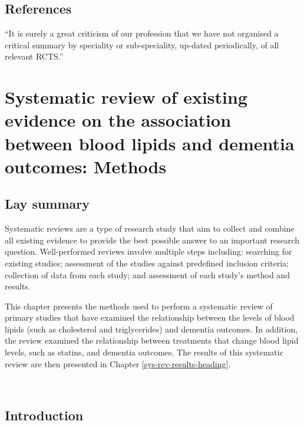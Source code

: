 \documentclass[a4paper, twoside]{templates/ociamthesis}
\begin{document}
\newpage

\hypertarget{references}{%
\section{References}\label{references}}

\begin{savequote}
``It is surely a great criticism of our profession that we have not
organised a critical summary by speciality or sub-speciality, up-dated
periodically, of all relevant RCTS.''
\end{savequote}



\hypertarget{sys-rev-methods-heading}{%
\chapter{Systematic review of existing evidence on the association between blood lipids and dementia outcomes: Methods}\label{sys-rev-methods-heading}}

\minitoc 

\hypertarget{lay-summary-2}{%
\section{Lay summary}\label{lay-summary-2}}

Systematic reviews are a type of research study that aim to collect and combine all existing evidence to provide the best possible answer to an important research question. Well-performed reviews involve multiple steps including: searching for existing studies; assessment of the studies against predefined inclusion criteria; collection of data from each study; and assessment of each study's method and results.

This chapter presents the methods used to perform a systematic review of primary studies that have examined the relationship between the levels of blood lipids (such as cholesterol and triglycerides) and dementia outcomes. In addition, the review examined the relationship between treatments that change blood lipid levels, such as statins, and dementia outcomes. The results of this systematic review are then presented in Chapter \ref{sys-rev-results-heading}.

~

\hypertarget{sys-rev-intro}{%
\section{Introduction}\label{sys-rev-intro}}
\end{document}
